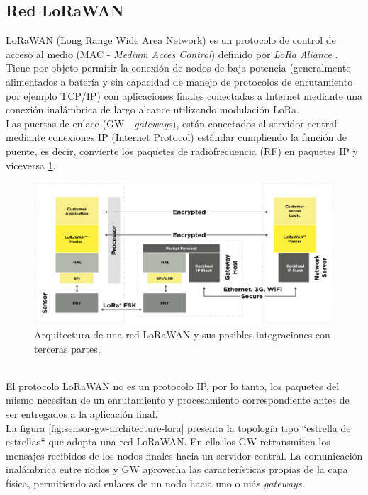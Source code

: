\subsection{Red LoRaWAN}
LoRaWAN (Long Range Wide Area Network) es un protocolo de control de acceso al medio (MAC - \textit{Medium Acces Control}) definido por \textit{LoRa Aliance} \citep{lora_alliance}. Tiene por objeto permitir la conexión de nodos de baja potencia (generalmente alimentados a batería y sin capacidad de manejo de protocolos de enrutamiento por ejemplo TCP/IP) con aplicaciones finales conectadas a Internet mediante una conexión inalámbrica de largo alcance utilizando modulación LoRa.\\
Las puertas de enlace (GW - \textit{gateways}), están conectados al servidor central mediante conexiones IP (Internet Protocol) estándar cumpliendo la función de puente, es decir, convierte los paquetes de radiofrecuencia (RF) en paquetes IP y viceversa \ref{fig:arqlorawan}.\\
\begin{figure}[h]
	\centering
	\includegraphics[width=0.9\linewidth]{Figures/arq_lorawan_2}
	\caption{Arquitectura de una red LoRaWAN y sus posibles integraciones con terceras partes.}
	\label{fig:arqlorawan}
\end{figure}\\
El protocolo LoRaWAN no es un protocolo IP, por lo tanto, los paquetes del mismo necesitan de un enrutamiento y procesamiento correspondiente antes de ser entregados a la aplicación final.\\
La figura \ref{fig:sensor-gw-architecture-lora} presenta la topología tipo ``estrella de estrellas`` que adopta una red LoRaWAN. En ella los GW retransmiten los mensajes recibidos de los nodos finales hacia un servidor central. La comunicación inalámbrica entre nodos y GW aprovecha las características propias de la capa física, permitiendo así enlaces de un nodo hacia uno o más \textit{gateways}.\\
